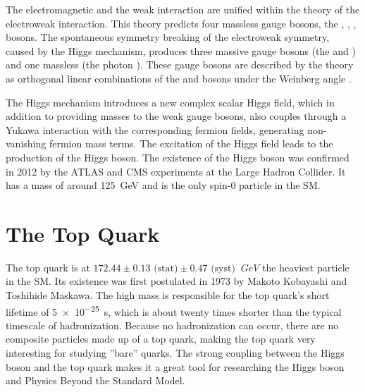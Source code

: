 The electromagnetic and the weak interaction are unified within the theory of the electroweak interaction. This theory predicts four massless gauge bosons, the \PBzero, \PWzero, \PWone, \PWtwo bosons. The spontaneous symmetry breaking of the electroweak symmetry, caused by the Higgs mechanism, produces three massive gauge bosons (the \PZzero and \PWpm) and one massless (the photon \Pphoton). These gauge bosons are described by the theory as orthogonal linear combinations of the \PBzero and \PWzero bosons under the Weinberg angle \cite{wiki:electroweak}.

The Higgs mechanism introduces a new complex scalar Higgs field, which in addition to providing masses to the weak gauge bosons, also couples through a Yukawa interaction with the corresponding fermion fields, generating non-vanishing fermion mass terms. The excitation of the Higgs field leads to the production of the Higgs boson. The existence of the Higgs boson was confirmed in 2012 by the ATLAS and CMS experiments at the Large Hadron Collider. It has a mass of around \SI{125}{\giga\eV} \cite{Cha12} and is the only spin-0 particle in the SM.

\section{The Top Quark}
\label{sec:theory_top}
The top quark is at $172.44 \pm 0.13 \text{ (stat)} \pm 0.47 \text{ (syst) }\SI{}{GeV}$ \cite{ACCC14} the heaviest particle in the SM. Its existence was first postulated in 1973 by Makoto Kobayashi and Toshihide Maskawa. The high mass is responsible for the top quark's short lifetime of \SI{5e-25}{s}, which is about twenty times shorter than the typical timescale of hadronization. Because no hadronization can occur, there are no composite particles made up of a top quark, making the top quark very interesting for studying ''bare'' quarks. The strong coupling between the Higgs boson and the top quark makes it a great tool for researching the Higgs boson and Physics Beyond the Standard Model.

